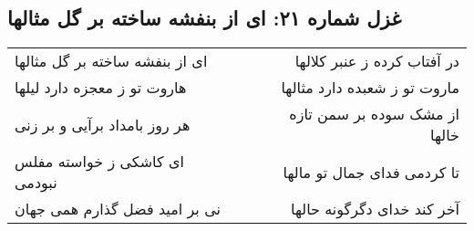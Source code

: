 \begin{center}
\section*{غزل شماره ۲۱: ای از بنفشه ساخته بر گل مثالها}
\label{sec:021}
\begin{longtable}{l p{0.5cm} r}
ای از بنفشه ساخته بر گل مثالها
&&
در آفتاب کرده ز عنبر کلالها
\\
هاروت تو ز معجزه دارد لیلها
&&
ماروت تو ز شعبده دارد مثالها
\\
هر روز بامداد برآیی و بر زنی
&&
از مشک سوده بر سمن تازه خالها
\\
ای کاشکی ز خواسته مفلس نبودمی
&&
تا کردمی فدای جمال تو مالها
\\
نی بر امید فضل گذارم همی جهان
&&
آخر کند خدای دگرگونه حالها
\\
\end{longtable}
\end{center}
